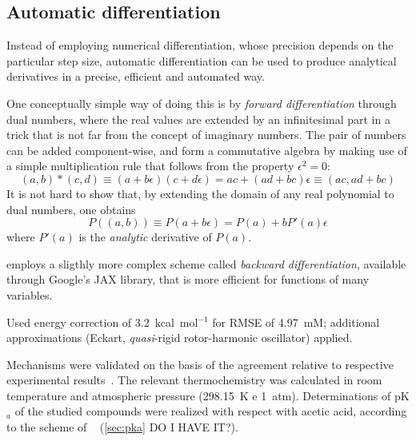 \subsection{Automatic differentiation}

Instead of employing numerical differentiation,
whose precision depends on the
particular step size,
automatic differentiation can be used to produce
analytical derivatives in a precise,
efficient and automated way.

One conceptually simple way of doing this is by \emph{forward differentiation}
through dual numbers,
where the real values are extended by an infinitesimal
part in a trick that is not far from the concept of imaginary numbers.
The pair of numbers can be added component-wise,
and form a commutative algebra
by making use of a simple multiplication rule that follows from the property
$\epsilon^2 = 0$:
\begin{equation}
	(a,
	b) * (c,
	d)
	\equiv (a + b\epsilon)(c + d\epsilon)
	= a c + (a d + b c)\epsilon
	\equiv (a c,
	a d + b c)
\end{equation}
It is not hard to show that,
by extending the domain of any real polynomial to
dual numbers,
one obtains
\begin{equation}
	P((a,
	b)) \equiv P(a + b\epsilon) = P(a) + b P'(a) \epsilon
\end{equation}
where $P'(a)$ is the \emph{analytic} derivative of $P(a)$.

\overreact employs a sligthly more complex scheme called
\emph{backward differentiation},
available through Google's JAX library,
that
is more efficient for functions of many variables.

Used energy correction of 3.2~kcal~mol$^{-1}$ for RMSE of 4.97~mM;\@
additional approximations (Eckart,
\emph{quasi}-rigid rotor-harmonic oscillator) applied.

Mechanisms were validated on the basis of the agreement relative to respective experimental results~\cite{Kirby_1972,Jung_2005}.
The relevant thermochemistry was calculated in room temperature and atmospheric pressure (298.15~K e 1~atm).
Determinations of pK$_a$ of the studied compounds were realized with respect with acetic acid,
according to the scheme of \citeauthor{Ding_2009}~\cite{Ding_2009} (\cref{sec:pka} DO I HAVE IT?).

